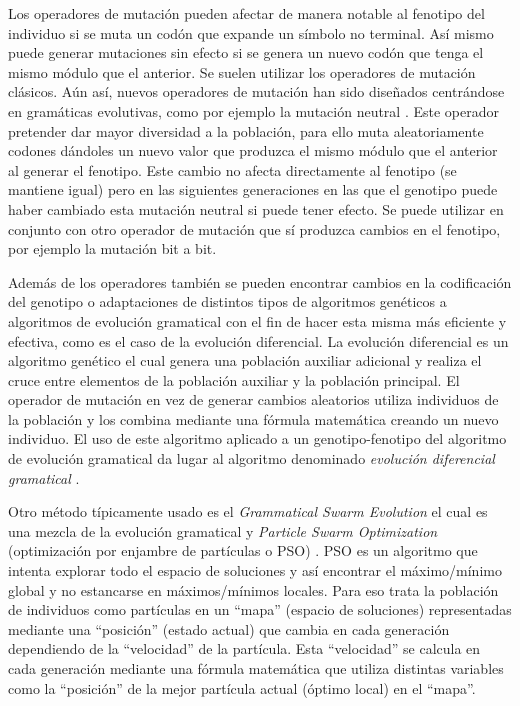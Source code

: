 Los operadores de mutación pueden afectar de manera notable al fenotipo del individuo si se muta un codón que expande un símbolo no terminal. Así mismo puede generar mutaciones sin efecto si se genera un nuevo codón que tenga el mismo módulo que el anterior. Se suelen utilizar los operadores de mutación clásicos. Aún así, nuevos operadores de mutación han sido diseñados centrándose en gramáticas evolutivas, como por ejemplo la mutación neutral \cite{Oesch2015}. Este operador pretender dar mayor diversidad a la población, para ello muta aleatoriamente codones dándoles un nuevo valor que produzca el mismo módulo que el anterior al generar el fenotipo. Este cambio no afecta directamente al fenotipo (se mantiene igual) pero en las siguientes generaciones en las que el genotipo puede haber cambiado esta mutación neutral si puede tener efecto. Se puede utilizar en conjunto con otro operador de mutación que sí produzca cambios en el fenotipo, por ejemplo la mutación bit a bit.

Además de los operadores también se pueden encontrar cambios en la codificación del genotipo \cite{lourencco2016unveiling} o adaptaciones de distintos tipos de algoritmos genéticos a algoritmos de evolución gramatical con el fin de hacer esta misma más eficiente y efectiva, como es el caso de la evolución diferencial. La evolución diferencial es un algoritmo genético el cual genera una población auxiliar adicional y realiza el cruce entre elementos de la población auxiliar y la población principal. El operador de mutación en vez de generar cambios aleatorios utiliza individuos de la población y los combina mediante una fórmula matemática creando un nuevo individuo. El uso de este algoritmo aplicado a un genotipo-fenotipo del algoritmo de evolución gramatical da lugar al algoritmo denominado \textit{evolución diferencial gramatical} \cite{o2006grammatical}.

Otro método típicamente usado es el \textit{Grammatical Swarm Evolution} el cual es una mezcla de la evolución gramatical y \textit{Particle Swarm Optimization} (optimización por enjambre de partículas o PSO) \cite{o2004grammatical} \cite{gomez2010particle}. PSO es un algoritmo que intenta explorar todo el espacio de soluciones y así encontrar el máximo/mínimo global y no estancarse en máximos/mínimos locales. Para eso trata la población de individuos como partículas en un ``mapa'' (espacio de soluciones) representadas mediante una ``posición'' (estado actual) que cambia en cada generación dependiendo de la ``velocidad''  de la partícula. Esta ``velocidad'' se calcula en cada generación mediante una fórmula matemática que utiliza distintas variables como la ``posición'' de la mejor partícula actual (óptimo local) en el ``mapa''.

